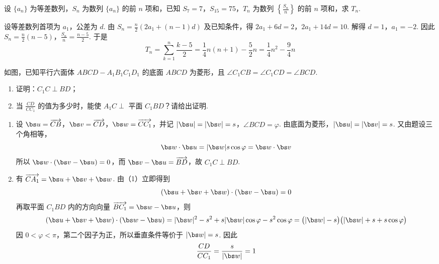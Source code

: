 \begin{problem}
设 \(\{a_{n}\}\) 为等差数列，\(S_{n}\) 为数列 \(\{a_{n}\}\) 的前 \(n\) 项和，已知 \(S_{7}=7\)，\(S_{15}=75\)，\(T_{n}\) 为数列 \(\left\{\frac{S_{n}}{n}\right\}\) 的前 \(n\) 项和，求 \(T_{n}\).

\begin{solution}
设等差数列首项为 \(a_1\)，公差为 \(d\). 由 \(S_n=\frac n2(2a_1+(n-1)d)\) 及已知条件，得
\(2a_1+6d=2\)，\(2a_1+14d=10\).
解得 \(d=1\)，\(a_1=-2\). 因此
\(S_n=\frac n2(n-5)\)，\(\frac{S_n}{n}=\frac{n-5}{2}\).
于是
\[
T_n=\sum_{k=1}^n\frac{k-5}{2}=\frac14n(n+1)-\frac52n=\frac14n^2-\frac94n
\]
\end{solution}
\end{problem}

\begin{problem}
如图，已知平行六面体 \(ABCD-A_{1}B_{1}C_{1}D_{1}\) 的底面 \(ABCD\) 为菱形，且 \(\angle C_{1}CB=\angle C_{1}CD=\angle BCD\).

\begin{enumerate}
\item 证明：\(C_{1}C\perp BD\)；
\item 当 \(\frac{CD}{CC_{1}}\) 的值为多少时，能使 \(A_{1}C\perp\) 平面 \(C_{1}BD\)？请给出证明.
\end{enumerate}


\begin{solution}
\begin{enumerate}
\item 设 \(\bs u=\overrightarrow{CB}\)，\(\bs v=\overrightarrow{CD}\)，\(\bs w=\overrightarrow{CC_1}\)，并记 \(\lvert\bs u\rvert=\lvert\bs v\rvert=s\)，\(\angle BCD=\varphi\). 由底面为菱形，\(\lvert\bs u\rvert=\lvert\bs v\rvert=s\). 又由题设三个角相等，
\[
\bs w\cdot\bs u=\lvert\bs w\rvert s\cos\varphi=\bs w\cdot\bs v
\]
所以 \(\bs w\cdot(\bs v-\bs u)=0\)，而 \(\bs v-\bs u=\overrightarrow{BD}\)，故 \(C_1C\perp BD\).
\item 有 \(\overrightarrow{CA_1}=\bs u+\bs v+\bs w\). 由（1）立即得到
\[
(\bs u+\bs v+\bs w)\cdot(\bs v-\bs u)=0
\]
再取平面 \(C_1BD\) 内的方向向量 \(\overrightarrow{BC_1}=\bs w-\bs u\)，则
\[
(\bs u+\bs v+\bs w)\cdot(\bs w-\bs u)
=\lvert\bs w\rvert^2-s^2+s\lvert\bs w\rvert\cos\varphi-s^2\cos\varphi
=\bigl(\lvert\bs w\rvert-s\bigr)\bigl(\lvert\bs w\rvert+s+s\cos\varphi\bigr)
\]
因 \(0<\varphi<\pi\)，第二个因子为正，所以垂直条件等价于 \(\lvert\bs w\rvert=s\). 因此
\[
\frac{CD}{CC_1}=\frac{s}{\lvert\bs w\rvert}=1
\]
\end{enumerate}
\end{solution}
\end{problem}

